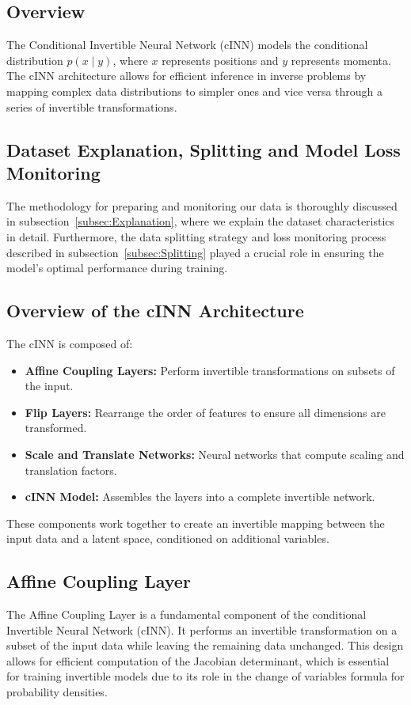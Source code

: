 \documentclass[11pt]{paper}
\begin{document}
\subsection{Overview}
The Conditional Invertible Neural Network (cINN) models the conditional distribution $p(x \mid y)$, where $x$ represents positions and $y$ represents momenta. The cINN architecture allows for efficient inference in inverse problems by mapping complex data distributions to simpler ones and vice versa through a series of invertible transformations.

\subsection{Dataset Explanation, Splitting and Model Loss Monitoring}
The methodology for preparing and monitoring our data is thoroughly discussed in subsection~\ref{subsec:Explanation}, where we explain the dataset characteristics in detail. Furthermore, the data splitting strategy and loss monitoring process described in subsection~\ref{subsec:Splitting} played a crucial role in ensuring the model's optimal performance during training.

\subsection{Overview of the cINN Architecture}
The cINN is composed of:

\begin{itemize}
    \item \textbf{Affine Coupling Layers:} Perform invertible transformations on subsets of the input.
    \item \textbf{Flip Layers:} Rearrange the order of features to ensure all dimensions are transformed.
    \item \textbf{Scale and Translate Networks:} Neural networks that compute scaling and translation factors.
    \item \textbf{cINN Model:} Assembles the layers into a complete invertible network.
\end{itemize}
These components work together to create an invertible mapping between the input data and a latent space, conditioned on additional variables.

\subsection{Affine Coupling Layer}

The Affine Coupling Layer is a fundamental component of the conditional Invertible Neural Network (cINN). It performs an invertible transformation on a subset of the input data while leaving the remaining data unchanged. This design allows for efficient computation of the Jacobian determinant, which is essential for training invertible models due to its role in the change of variables formula for probability densities.
\end{document}
